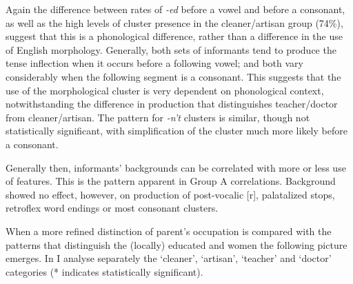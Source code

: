 Again the difference between rates of \textit{-ed} before a vowel and before a consonant, as well as the high levels of cluster presence in the cleaner\slash artisan group (74\%), suggest that this is a phonological difference, rather than a difference in the use of English morphology.  Generally, both sets of informants tend to produce the tense inflection when it occurs before a following vowel; and both vary considerably when the following segment is a consonant.  This suggests that the use of the morphological cluster is very dependent on phonological context, notwithstanding the difference in production that distinguishes teacher\slash doctor from cleaner\slash artisan.  The pattern for \textit{-n’t} clusters is similar, though not statistically significant, with simplification of the cluster much more likely before a consonant.

Generally then, informants’ backgrounds can be correlated with more or less use of  features.  This is the pattern apparent in Group A correlations.  Background showed no effect, however, on production of post-vocalic [r], palatalized stops, retroflex word endings or most consonant clusters. 

When a more refined distinction of parent’s occupation is compared with the patterns that distinguish the (locally) educated and women the following picture emerges.  In  I analyse separately the ‘cleaner’, ‘artisan’, ‘teacher’ and ‘doctor’ categories (* indicates statistically significant).

\begin{table}
\caption{Variables and distribution by parent’s occupation\label{tab:3.47}}
\end{table}

